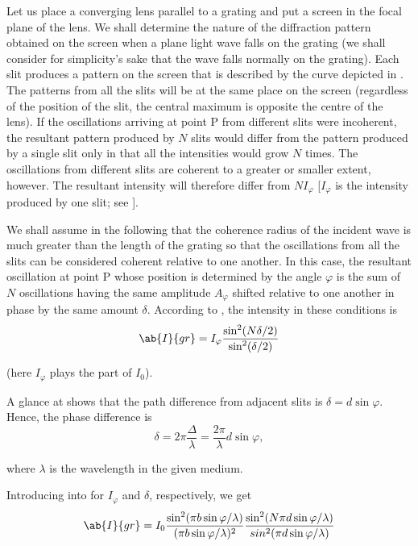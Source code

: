 Let us place a converging lens parallel to a grating and put a screen in the focal plane of the lens.
We shall determine the nature of the diffraction pattern obtained on the screen when a plane light wave falls on the grating (we shall consider for
simplicity's sake that the wave falls normally on the grating).
Each slit produces a pattern on the screen that is
described by the curve depicted in .
The patterns from all the slits will be at the same place on the screen (regardless of the position of the slit, the central maximum is opposite the centre of the lens).
If the oscillations arriving at point P from different slits were incoherent, the resultant pattern produced by $N$ slits would differ from the pattern produced by a single slit only in that all the intensities would grow $N$ times.
The oscillations from different slits are coherent to a greater or smaller extent, however.
The resultant intensity will therefore differ from $NI_{\varphi}$ [$I_{\varphi}$ is the intensity produced by one slit; see ].

We shall assume in the following that the coherence radius of the incident wave is much greater than the length of the grating so that the oscillations from all the slits can be considered coherent relative to one another.
In this case, the resultant oscillation at point P
whose position is determined by the angle $\varphi$ is the sum of $N$ oscillations having the same amplitude $A_{\varphi}$ shifted relative to one another in phase by the same amount $\delta$.
According to , the intensity in these conditions is
\begin{equation}\label{eq:18_38}
	\ab{I}{gr} = I_{\varphi} \frac{\sin^2(N\delta/2)}{\sin^2(\delta/2)}
\end{equation}

\noindent
(here $I_{\varphi}$ plays the part of $I_0$).

A glance at  shows that the path difference from adjacent slits is $\delta=d \sin\varphi$.
Hence, the phase difference is
\begin{equation}\label{eq:18_39}
	\delta = 2\pi \frac{\Delta}{\lambda} = \frac{2\pi}{\lambda} d \sin\varphi,
\end{equation}

\noindent
where $\lambda$ is the wavelength in the given medium.

Introducing into   for $I_{\varphi}$ and $\delta$, respectively, we get
\begin{equation}\label{eq:18_40}
	\ab{I}{gr} = I_0 \frac{\sin^2(\pi b \sin\varphi /\lambda)}{(\pi b \sin\varphi /\lambda)^2} \frac{\sin^2(N\pi d \sin\varphi /\lambda)}{sin^2(\pi d \sin\varphi /\lambda)}
\end{equation}

